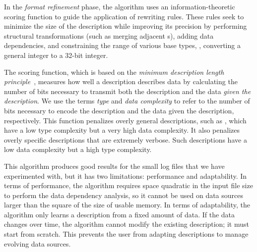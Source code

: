 In the {\em format refinement} phase,
the algorithm uses an information-theoretic scoring function to guide the
application of rewriting rules.
These rules seek to minimize the size of the description while
improving its precision by performing structural transformations (such
as merging adjacent s),  adding data dependencies, and
constraining the range of various base types, \eg{}, converting a
general integer to a 32-bit integer.  

The scoring function, which is based on the \textit{minimum
  description length principle}~\cite{mdlbook}, 
measures how well a description describes data by calculating
the number of bits necessary to transmit both the description and the
data \textit{given the description}.  We use the terms \textit{type}
  and \textit{data complexity} to refer to the number of bits necessary to
encode the description and the data given the description,
respectively.  This function penalizes overly
general descriptions, such as , which have a
low type complexity but a very high data complexity.  It also
penalizes overly specific descriptions that are extremely verbose.
Such descriptions have a low data complexity but a high type 
complexity.

This algorithm produces good results for the small
log files that we have experimented with, but it has two limitations:
performance and adaptability.  In terms of performance, the algorithm
requires space quadratic in the input file size to perform the data
dependency analysis, so it cannot be used on data sources larger than the
square of the size of usable memory. In terms of adaptability, the
algorithm only learns a description from a fixed amount of data.
If the data changes over time,
the algorithm cannot modify the existing description; 
it must start from scratch. This prevents the user from adapting
descriptions to manage evolving data sources.


%
%
%
%
